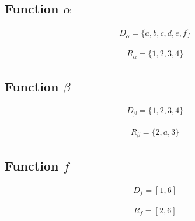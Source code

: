 \documentclass[12pt, letterpaper]{article}
\begin{document}
        \subsection{Function \(\alpha\)}
        \vspace{-2pt}
        \begin{minipage}{0.5\textwidth}
            \begin{align*}
                & D_{\alpha} = \{a, b, c, d, e, f\}
            \end{align*}
        \end{minipage}
        \begin{minipage}{0.5\textwidth}
            \begin{align*}
                & R_{\alpha} = \{1, 2, 3, 4\}
            \end{align*}
        \end{minipage}

        \subsection{Function \(\beta\)}
        \vspace{-2pt}
        \begin{minipage}{0.5\textwidth}
            \begin{align*}
                & D_{\beta} = \{1, 2, 3, 4\}
            \end{align*}
        \end{minipage}
        \begin{minipage}{0.5\textwidth}
            \begin{align*}
                & R_{\beta} = \{2, a, 3\}
            \end{align*}
        \end{minipage}

        \subsection{Function \(f\)}
        \vspace{-2pt}
        \begin{minipage}{0.5\textwidth}
            \begin{align*}
                & D_{f} = \left[1, 6\right]
            \end{align*}
        \end{minipage}
        \begin{minipage}{0.5\textwidth}
            \begin{align*}
                & R_{f} = \left[2, 6\right]
            \end{align*}
        \end{minipage}
\end{document}
